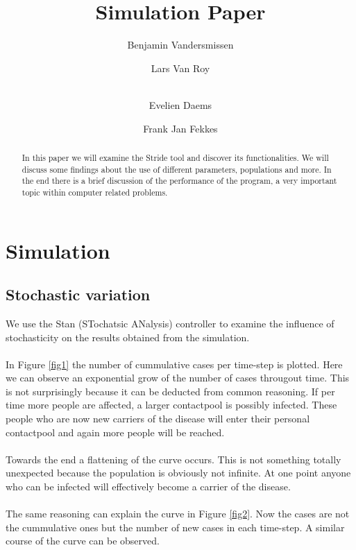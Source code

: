 \documentclass[runningheads]{llncs}
\begin{document}
%
\title{Simulation Paper}

\author{Benjamin Vandersmissen \and
Lars Van Roy \and \\
Evelien Daems \and
Frank Jan Fekkes}
%
%
%
\maketitle              %
%
\begin{abstract}
In this paper we will examine the Stride tool and discover its functionalities.
We will discuss some findings about the use of different parameters, populations and more.
In the end there is a brief discussion of the performance of the program, a very important topic within computer related problems.

\end{abstract}

\section{Simulation}

\subsection{Stochastic variation}
We use the Stan (STochatsic ANalysis) controller to examine the influence of stochasticity on the results obtained from the simulation. \\ \\
In Figure \ref{fig1} the number of cummulative cases per time-step is plotted. Here we can observe an exponential grow of the number of cases througout time. This is not surprisingly because it can be deducted from common reasoning. If per time more people are affected, a larger contactpool is possibly infected. These people who are now new carriers of the disease will enter their personal contactpool and again more people will be reached.\\ \\
Towards the end a flattening of the curve occurs. This is not something totally unexpected because the population is obviously not infinite. At one point anyone who can be infected will effectively become a carrier of the disease.\\ \\
The same reasoning can explain the curve in Figure \ref{fig2}. Now the cases are not the cummulative ones but the number of new cases in each time-step. A similar course of the curve can be observed.
\end{document}

